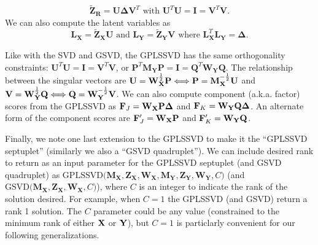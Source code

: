 \documentclass[12pt]{article}
\begin{document}
\begin{equation}
\widetilde{\mathbf Z}_{\mathbf R} = {\mathbf U} {\boldsymbol \Delta} {\mathbf V}^{T}
\textrm{ with }
{\mathbf U}^{T}{\mathbf U} = {\mathbf I} =
{\mathbf V}^{T}{\mathbf V}.
\end{equation} We can also compute the latent variables as
\begin{equation}
{\mathbf L}_{\mathbf X} 
= \widetilde{\mathbf Z}_{\mathbf X}{\mathbf U} 
\textrm{ and } 
{\mathbf L}_{\mathbf Y} = 
\widetilde{\mathbf Z}_{\mathbf Y}{\mathbf V}
\textrm{ where }
{\mathbf L}_{\mathbf X}^{T} {\mathbf L}_{\mathbf Y} 
= {\boldsymbol \Delta}. 
\end{equation}

Like with the SVD and GSVD, the GPLSSVD has the same orthogonality
constraints:
\({\mathbf U}^{T}{\mathbf U} = {\mathbf I} = {\mathbf V}^{T}{\mathbf V}\),
or
\({\mathbf P}^{T}{\mathbf M}_{\mathbf Y}{\mathbf P} = {\mathbf I} = {\mathbf Q}^{T}{\mathbf W}_{\mathbf Y}{\mathbf Q}\).
The relationship between the singular vectors are
\({\mathbf U} = {\mathbf W}_{\bf X}^{\frac{1}{2}}{\mathbf P} \Longleftrightarrow {\mathbf P} = {\mathbf M}_{\bf X}^{-\frac{1}{2}}{\mathbf U}\)
and
\({\mathbf V} = {\mathbf W}_{\bf Y}^{\frac{1}{2}}{\mathbf Q} \Longleftrightarrow {\mathbf Q} = {\mathbf W}_{\bf Y}^{-\frac{1}{2}}{\mathbf V}\).
We can also compute component (a.k.a. factor) scores from the GPLSSVD as
\({\bf F}_{J} = {\mathbf W}_{\bf X}{\mathbf P}{\boldsymbol \Delta}\) and
\({\bf F}_{K} = {\mathbf W}_{\bf Y}{\mathbf Q}{\boldsymbol \Delta}\). An
alternate form of the component scores are
\({\bf F}_{J}' = {\mathbf W}_{\bf X}{\mathbf P}\) and
\({\bf F}_{K}' = {\mathbf W}_{\bf Y}{\mathbf Q}\).

Finally, we note one last extension to the GPLSSVD to make it the
``GPLSSVD septuplet'' (similarly we also a ``GSVD quadruplet''). We can
include desired rank to return as an input parameter for the GPLSSVD
septuplet (and GSVD quadruplet) as
\(\mathrm{GPLSSVD(} {\mathbf M}_{\mathbf X}, {\mathbf Z}_{\mathbf X}, {\mathbf W}_{\mathbf X}, {\mathbf M}_{\mathbf Y}, {\mathbf Z}_{\mathbf Y}, {\mathbf W}_{\mathbf Y}, C \mathrm{)}\)
(and
\(\mathrm{GSVD(} {\mathbf M}_{\mathbf X}, {\mathbf Z}_{\mathbf X}, {\mathbf W}_{\mathbf X}, C \mathrm{)}\)),
where \(C\) is an integer to indicate the rank of the solution desired.
For example, when \(C = 1\) the GPLSSVD (and GSVD) return a rank 1
solution. The \(C\) parameter could be any value (constrained to the
minimum rank of either \({\bf X}\) or \({\bf Y}\)), but \(C=1\) is
particlarly convenient for our following generalizations.
\end{document}

